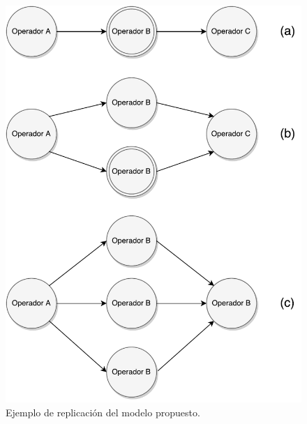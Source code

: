\begin{figure}[!ht]
	\centering
		\includegraphics[scale=0.6]{images/EjReplicacion.pdf}
	\caption{Ejemplo de replicaci\'on del modelo propuesto.}
	\label{fig:ejReplicacion}
\end{figure}


